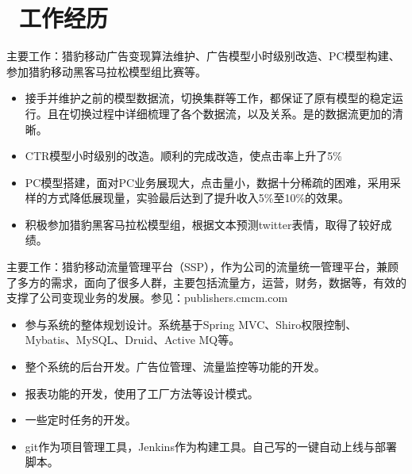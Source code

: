 \documentclass{resume}
\begin{document}



\section{\faUsers\ 工作经历}
\role{CTR、CVR预估}{广告算法}
\begin{onehalfspacing}
主要工作：猎豹移动广告变现算法维护、广告模型小时级别改造、PC模型构建、参加猎豹移动黑客马拉松模型组比赛等。
\begin{itemize}
  \item 接手并维护之前的模型数据流，切换集群等工作，都保证了原有模型的稳定运行。且在切换过程中详细梳理了各个数据流，以及关系。是的数据流更加的清晰。 
  \item CTR模型小时级别的改造。顺利的完成改造，使点击率上升了5\%
  \item PC模型搭建，面对PC业务展现大，点击量小，数据十分稀疏的困难，采用采样的方式降低展现量，实验最后达到了提升收入5\%至10\%的效果。
  \item 积极参加猎豹黑客马拉松模型组，根据文本预测twitter表情，取得了较好成绩。
\end{itemize}
\end{onehalfspacing}

\begin{onehalfspacing}
主要工作：猎豹移动流量管理平台（SSP），作为公司的流量统一管理平台，兼顾了多方的需求，面向了很多人群，主要包括流量方，运营，财务，数据等，有效的支撑了公司变现业务的发展。参见：publishers.cmcm.com
\begin{itemize}
  \item 参与系统的整体规划设计。系统基于Spring MVC、Shiro权限控制、Mybatis、MySQL、Druid、Active MQ等。
  \item 整个系统的后台开发。广告位管理、流量监控等功能的开发。
  \item 报表功能的开发，使用了工厂方法等设计模式。
  \item 一些定时任务的开发。
  \item git作为项目管理工具，Jenkins作为构建工具。自己写的一键自动上线与部署脚本。 
\end{itemize}
\end{onehalfspacing}
\end{document}
